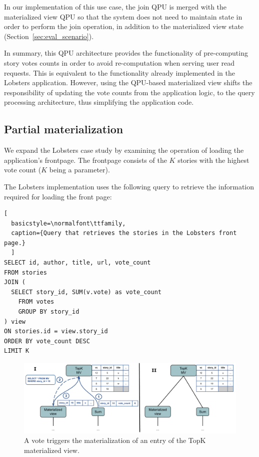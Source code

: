 In our implementation of this use case,
the join QPU is merged with the materialized view QPU so that the system does not need to maintain state
in order to perform the join operation, in addition to the materialized view state (Section~\ref{sec:eval_scenario}).

In summary,
this QPU architecture provides the functionality of pre-computing story votes counts in order to avoid re-computation
when serving user read requests.
This is equivalent to the functionality already implemented in the Lobsters application.
However, using the QPU-based materialized view shifts the responsibility of updating the vote counts from the application logic,
to the query processing architecture, thus simplifying the application code.


\subsection{Partial materialization}

We expand the Lobsters case study by examining the operation of loading the application's frontpage.
The frontpage consists of the $K$ stories with the highest vote count ($K$ being a parameter).

The Lobsters implementation uses the following query to retrieve the information required for loading the front page:

\begin{lstlisting}[
  basicstyle=\normalfont\ttfamily,
  caption={Query that retrieves the stories in the Lobsters front page.}
  ]
SELECT id, author, title, url, vote_count
FROM stories
JOIN (
  SELECT story_id, SUM(v.vote) as vote_count
	FROM votes
	GROUP BY story_id
) view
ON stories.id = view.story_id
ORDER BY vote_count DESC
LIMIT K
\end{lstlisting}

\begin{figure}[t]
  \centering
    \includegraphics[scale=0.4]{./figures/case_studies/lobsters_architecture_materialization.pdf}
  \caption{A vote triggers the materialization of an entry of the TopK materialized view.}
  \label{fig:lobsters_architecture_materialization}
\end{figure}

